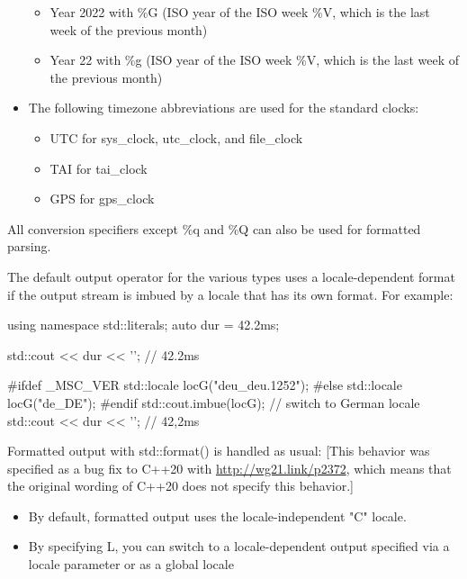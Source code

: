 \begin{itemize}
\begin{itemize}
\item 
Year 2022 with \%G (ISO year of the ISO week \%V, which is the last week of the previous month)

\item 
Year 22 with \%g (ISO year of the ISO week \%V, which is the last week of the previous month)
\end{itemize}

\item 
The following timezone abbreviations are used for the standard clocks:

\begin{itemize}
\item 
UTC for sys\_clock, utc\_clock, and file\_clock

\item 
TAI for tai\_clock

\item 
GPS for gps\_clock
\end{itemize}
\end{itemize}

All conversion specifiers except \%q and \%Q can also be used for formatted parsing.


The default output operator for the various types uses a locale-dependent format if the output stream is imbued by a locale that has its own format. For example:

\begin{cpp}
using namespace std::literals;
auto dur = 42.2ms;

std::cout << dur << '\n'; // 42.2ms

#ifdef _MSC_VER
	std::locale locG("deu_deu.1252");
#else
	std::locale locG("de_DE");
#endif
std::cout.imbue(locG); // switch to German locale
std::cout << dur << '\n'; // 42,2ms
\end{cpp}

Formatted output with std::format() is handled as usual: [This behavior was specified as a bug fix to C++20 with \url{http://wg21.link/p2372}, which means that the original wording of C++20 does not specify this behavior.]

\begin{itemize}
\item 
By default, formatted output uses the locale-independent "C" locale.

\item 
By specifying L, you can switch to a locale-dependent output specified via a locale parameter or as a global locale
\end{itemize}

